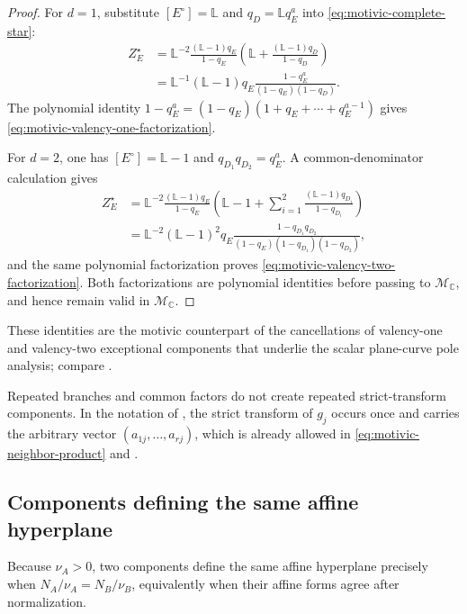 \documentclass[12pt]{amsart}
\numberwithin{equation}{section}
\theoremstyle{plain}
\theoremstyle{definition}
\theoremstyle{remark}
\theoremstyle{definition}
\newcommand{\Lef}{\mathbb L}
\newcommand{\Mmot}{\mathcal M_{\mathbb C}}
\begin{document}
\begin{proof}
For $d=1$, substitute $[E^\circ]=\Lef$ and $q_D=\Lef q_E^a$ into \eqref{eq:motivic-complete-star}:
\begin{equation*}
\begin{aligned}
 Z_E^\star&=\Lef^{-2}\frac{(\Lef-1)q_E}{1-q_E}\left(\Lef+\frac{(\Lef-1)q_D}{1-q_D}\right)\\
 &=\Lef^{-1}(\Lef-1)q_E\frac{1-q_E^a}{(1-q_E)(1-q_D)}.
 \end{aligned}
\end{equation*}
The polynomial identity $1-q_E^a=(1-q_E)(1+q_E+\cdots+q_E^{a-1})$ gives \eqref{eq:motivic-valency-one-factorization}.

For $d=2$, one has $[E^\circ]=\Lef-1$ and $q_{D_1}q_{D_2}=q_E^a$. A common-denominator calculation gives
\begin{equation*}
\begin{aligned}
 Z_E^\star&=\Lef^{-2}\frac{(\Lef-1)q_E}{1-q_E}\left(\Lef-1+\sum_{i=1}^2\frac{(\Lef-1)q_{D_i}}{1-q_{D_i}}\right)\\
 &=\Lef^{-2}(\Lef-1)^2q_E\frac{1-q_{D_1}q_{D_2}}{(1-q_E)(1-q_{D_1})(1-q_{D_2})},
 \end{aligned}
\end{equation*}
and the same polynomial factorization proves \eqref{eq:motivic-valency-two-factorization}. Both factorizations are polynomial identities before passing to $\Mmot$, and hence remain valid in $\Mmot$.
\end{proof}

These identities are the motivic counterpart of the cancellations of valency-one and valency-two exceptional components that underlie the scalar plane-curve pole analysis; compare \cite{Veys1995,Veys1997}.

Repeated branches and common factors do not create repeated strict-transform components. In the notation of , the strict transform of $g_j$ occurs once and carries the arbitrary vector $(a_{1j},\ldots,a_{rj})$, which is already allowed in \eqref{eq:motivic-neighbor-product} and .

\subsection{Components defining the same affine hyperplane}

Because $\nu_A>0$, two components define the same affine hyperplane precisely when $N_A/\nu_A=N_B/\nu_B$, equivalently when their affine forms agree after normalization.
\end{document}
